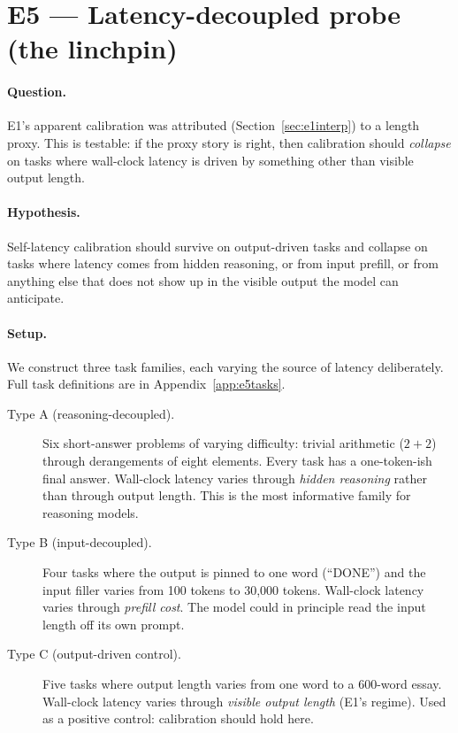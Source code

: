 \documentclass[11pt]{article}
\begin{document}
\section{E5 --- Latency-decoupled probe (the linchpin)}
\label{sec:e5}

\paragraph{Question.} E1's apparent calibration was attributed (Section~\ref{sec:e1interp}) to
a length proxy. This is testable: if the proxy story is right, then calibration should
\emph{collapse} on tasks where wall-clock latency is driven by something other than visible
output length.

\paragraph{Hypothesis.} Self-latency calibration should survive on output-driven tasks and
collapse on tasks where latency comes from hidden reasoning, or from input prefill, or from
anything else that does not show up in the visible output the model can anticipate.

\paragraph{Setup.} We construct three task families, each varying the source of latency
deliberately. Full task definitions are in Appendix~\ref{app:e5tasks}.

\begin{description}
\item[Type A (reasoning-decoupled).] Six short-answer problems of varying difficulty: trivial
arithmetic ($2+2$) through derangements of eight elements. Every task has a one-token-ish
final answer. Wall-clock latency varies through \emph{hidden reasoning} rather than through
output length. This is the most informative family for reasoning models.
\item[Type B (input-decoupled).] Four tasks where the output is pinned to one word (``DONE'')
and the input filler varies from 100 tokens to 30{,}000 tokens. Wall-clock latency varies
through \emph{prefill cost}. The model could in principle read the input length off its own
prompt.
\item[Type C (output-driven control).] Five tasks where output length varies from one word to
a 600-word essay. Wall-clock latency varies through \emph{visible output length} (E1's
regime). Used as a positive control: calibration should hold here.
\end{description}
\end{document}
